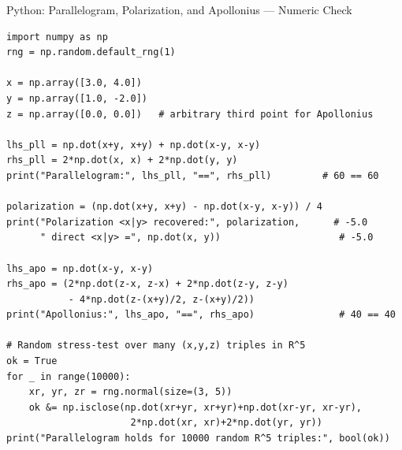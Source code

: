 \documentclass[aspectratio=169,10pt]{beamer}
\begin{document}
\begin{frame}[fragile]{Python: Parallelogram, Polarization, and Apollonius --- Numeric Check}

\begin{lstlisting}[style=pycode]
import numpy as np
rng = np.random.default_rng(1)

x = np.array([3.0, 4.0])
y = np.array([1.0, -2.0])
z = np.array([0.0, 0.0])   # arbitrary third point for Apollonius

lhs_pll = np.dot(x+y, x+y) + np.dot(x-y, x-y)
rhs_pll = 2*np.dot(x, x) + 2*np.dot(y, y)
print("Parallelogram:", lhs_pll, "==", rhs_pll)         # 60 == 60

polarization = (np.dot(x+y, x+y) - np.dot(x-y, x-y)) / 4
print("Polarization <x|y> recovered:", polarization,      # -5.0
      " direct <x|y> =", np.dot(x, y))                     # -5.0

lhs_apo = np.dot(x-y, x-y)
rhs_apo = (2*np.dot(z-x, z-x) + 2*np.dot(z-y, z-y)
           - 4*np.dot(z-(x+y)/2, z-(x+y)/2))
print("Apollonius:", lhs_apo, "==", rhs_apo)               # 40 == 40

# Random stress-test over many (x,y,z) triples in R^5
ok = True
for _ in range(10000):
    xr, yr, zr = rng.normal(size=(3, 5))
    ok &= np.isclose(np.dot(xr+yr, xr+yr)+np.dot(xr-yr, xr-yr),
                      2*np.dot(xr, xr)+2*np.dot(yr, yr))
print("Parallelogram holds for 10000 random R^5 triples:", bool(ok))
\end{lstlisting}
\end{frame}
\end{document}
